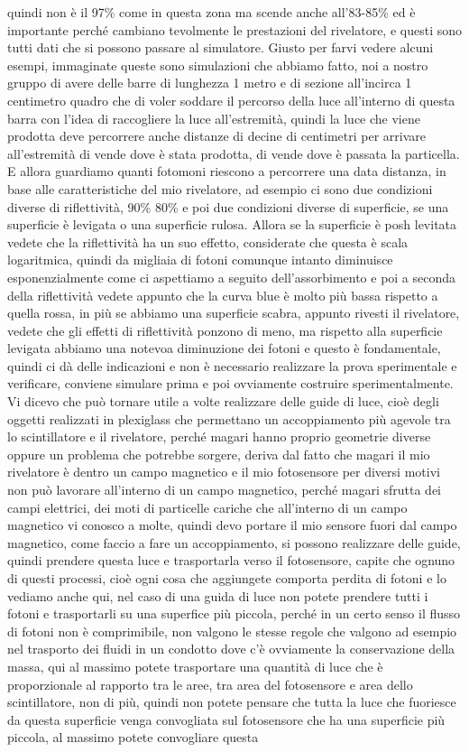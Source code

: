 {quindi non è il 97\% come in questa zona ma scende anche all'83-85\% ed è importante perché cambiano tevolmente le prestazioni del rivelatore, e questi sono tutti dati che si possono passare al simulatore. Giusto per farvi vedere alcuni esempi, immaginate queste sono simulazioni che abbiamo fatto, noi a nostro gruppo di avere delle barre di lunghezza 1 metro e di sezione all'incirca 1 centimetro quadro che di voler soddare il percorso della luce all'interno di questa barra con l'idea di raccogliere la luce all'estremità, quindi la luce che viene prodotta deve percorrere anche distanze di decine di centimetri per arrivare all'estremità di vende dove è stata prodotta, di vende dove è passata la particella. E allora guardiamo quanti fotomoni riescono a percorrere una data distanza, in base alle caratteristiche del mio rivelatore, ad esempio ci sono due condizioni diverse di riflettività, 90\% 80\% e poi due condizioni diverse di superficie, se una superficie è levigata o una superficie rulosa. Allora se la superficie è posh levitata vedete che la riflettività ha un suo effetto, considerate che questa è scala logaritmica, quindi da migliaia di fotoni comunque intanto diminuisce esponenzialmente come ci aspettiamo a seguito dell'assorbimento e poi a seconda della riflettività vedete appunto che la curva blue è molto più bassa rispetto a quella rossa, in più se abbiamo una superficie scabra, appunto rivesti il rivelatore, vedete che gli effetti di riflettività ponzono di meno, ma rispetto alla superficie levigata abbiamo una notevoa diminuzione dei fotoni e questo è fondamentale, quindi ci dà delle indicazioni e non è necessario realizzare la prova sperimentale e verificare, conviene simulare prima e poi ovviamente costruire sperimentalmente. Vi dicevo che può tornare utile a volte realizzare delle guide di luce, cioè degli oggetti realizzati in plexiglass che permettano un accoppiamento più agevole tra lo scintillatore e il rivelatore, perché magari hanno proprio geometrie diverse oppure un problema che potrebbe sorgere, deriva dal fatto che magari il mio rivelatore è dentro un campo magnetico e il mio fotosensore per diversi motivi non può lavorare all'interno di un campo magnetico, perché magari sfrutta dei campi elettrici, dei moti di particelle cariche che all'interno di un campo magnetico vi conosco a molte, quindi devo portare il mio sensore fuori dal campo magnetico, come faccio a fare un accoppiamento, si possono realizzare delle guide, quindi prendere questa luce e trasportarla verso il fotosensore, capite che ognuno di questi processi, cioè ogni cosa che aggiungete comporta perdita di fotoni e lo vediamo anche qui, nel caso di una guida di luce non potete prendere tutti i fotoni e trasportarli su una superfice più piccola, perché in un certo senso il flusso di fotoni non è comprimibile, non valgono le stesse regole che valgono ad esempio nel trasporto dei fluidi in un condotto dove c'è ovviamente la conservazione della massa, qui al massimo potete trasportare una quantità di luce che è proporzionale al rapporto tra le aree, tra area del fotosensore e area dello scintillatore, non di più, quindi non potete pensare che tutta la luce che fuoriesce da questa superficie venga convogliata sul fotosensore che ha una superficie più piccola, al massimo potete convogliare questa }
